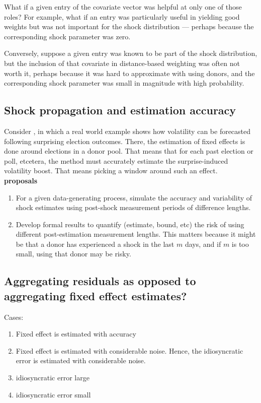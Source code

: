 \documentclass[11pt]{article}
\theoremstyle{definition}
\begin{document}
What if a given entry of the covariate vector was helpful at only one of those roles?  For example, what if an entry was particularly useful in yielding good weights but was not important for the shock distribution --- perhaps because the corresponding shock parameter was zero.  

Conversely, suppose a given entry was known to be part of the shock distribution, but the inclusion of that covariate in distance-based weighting was often not worth it, perhaps because it was hard to approximate with using donors, and the corresponding shock parameter was small in magnitude with high probability.

\subsection{Shock propagation and estimation accuracy}
Consider \cite{lundquist2024volatility}, in which a real world example shows how volatility can be forecasted following surprising election outcomes.  There, the estimation of fixed effects is done around elections in a donor pool.  That means that for each past election or poll, etcetera, the method must accurately estimate the surprise-induced volatility boost.  That means picking a window around such an effect.\\

\textbf{proposals}
\begin{enumerate}
  \item For a given data-generating process, simulate the accuracy and variability of shock estimates using post-shock measurement periods of difference lengths.
  \item Develop formal results to quantify (estimate, bound, etc) the risk of using different post-estimation measurement lengths.  This matters because it might be that a donor has experienced a shock in the last $m$ days, and if $m$ is too small, using that donor may be risky.
\end{enumerate}
    

\subsection{Aggregating residuals as opposed to aggregating fixed effect estimates?}

Cases:
\begin{enumerate}
  \item Fixed effect is estimated with accuracy 
  \item Fixed effect is estimated with considerable noise.  Hence, the idiosyncratic error is estimated with considerable noise.
  \item idiosyncratic error large
  \item idiosyncratic error small
\end{enumerate}  
\end{document}
